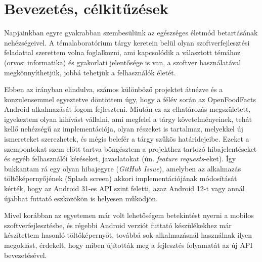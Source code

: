 \chapter{Bevezetés, célkitűzések}
Napjainkban egyre gyakrabban szembesülünk az egészséges életmód betartásának nehézségeivel.
A témalaboratórium tárgy keretein belül olyan szoftverfejlesztési feladattal szerettem volna
foglalkozni, ami kapcsolódik a választott témához (orvosi informatika) és gyakorlati
jelentősége is van, a szoftver használatával megkönnyíthetjük, jobbá tehetjük a felhasználók életét.

Ebben az irányban elindulva, számos különböző projektet átnézve és a konzulensemmel egyeztetve
döntöttem úgy, hogy a félév során az OpenFoodFacts %
Android alkalmazását fogom fejleszteni. Miután ez az elhatározás megszületett, igyekeztem olyan
kihívást vállalni, ami megfelel a tárgy követelményeinek, tehát kellő nehézségű az implementációja,
olyan részeket is tartalmaz, melyekkel új ismereteket szerezhetek, és mégis belefér a tárgy szűkös
határidejeibe. Ezeket a szempontokat szem előtt tartva böngésztem a projekthez tartozó
hibajelentéseket és egyéb felhasználói kéréseket, javaslatokat (ún. \textit{feature requests}-eket).
Így bukkantam rá egy olyan hibajegyre (\textit{GitHub Issue}), amelyben az alkalmazás
töltőképernyőjének (Splash screen) akkori implementációjának módosítását kérték, hogy
az Android 31-es API szint feletti, azaz Android 12-t vagy annál újabbat futtató eszközökön
is helyesen működjön.

Mivel korábban az egyetemen már volt lehetőségem betekintést nyerni a mobilos szoftverfejlesztésbe,
és régebbi Android verziót futtató készülékekhez már készítettem hasonló töltőképernyőt, továbbá
sok alkalmazásnál használnak ilyen megoldást, érdekelt, hogy miben újították meg a fejlesztés
folyamatát az új API bevezetésével.
